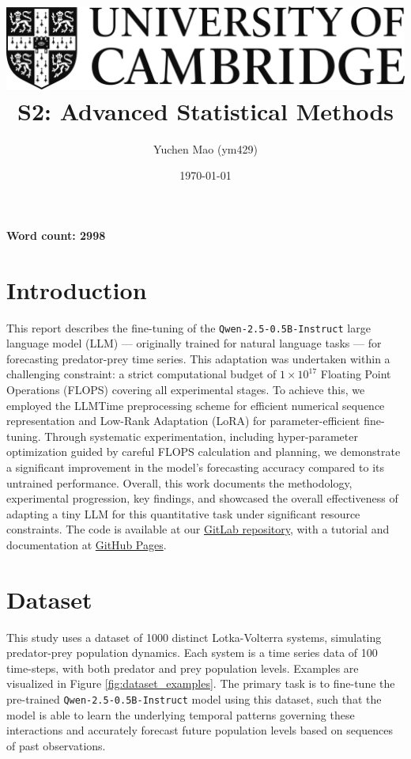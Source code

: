 \documentclass{article}
\title{
    \includegraphics[scale=0.2]{Images/cam_logo_bw.png}\\ %
    \vspace{0.5cm}
    S2: Advanced Statistical Methods
}
\author{Yuchen Mao (ym429)}
\affil{Department of Physics, University of Cambridge}
\date{\today}
\begin{document}
\maketitle
\noindent\textbf{Word count: 2998}
\tableofcontents
{}

\newpage


\section{Introduction}
\label{sec:introduction}

This report describes the fine-tuning of the \texttt{Qwen-2.5-0.5B-Instruct} large language model (LLM) — originally trained for natural language tasks — for forecasting predator-prey time series. This adaptation was undertaken within a challenging constraint: a strict computational budget of $1 \times 10^{17}$ Floating Point Operations (FLOPS) covering all experimental stages. To achieve this, we employed the LLMTime preprocessing scheme \cite{gruver2024largelanguagemodelszeroshot} for efficient numerical sequence representation and Low-Rank Adaptation (LoRA) \cite{hu2021loralowrankadaptationlarge} for parameter-efficient fine-tuning. Through systematic experimentation, including hyper-parameter optimization guided by careful FLOPS calculation and planning, we demonstrate a significant improvement in the model's forecasting accuracy compared to its untrained performance. Overall, this work documents the methodology, experimental progression, key findings, and showcased the overall effectiveness of adapting a tiny LLM for this quantitative task under significant resource constraints. The code is available at our \href{https://gitlab.developers.cam.ac.uk/phy/data-intensive-science-mphil/assessments/m2_coursework/ym429}{GitLab repository}, with a tutorial and documentation at \href{https://yuchen20.github.io/M2-Coursework/}{GitHub Pages}.

\section{Dataset}
\label{sec:dataset}

This study uses a dataset of 1000 distinct Lotka-Volterra systems, simulating predator-prey population dynamics. Each system is a time series data of 100 time-steps, with both predator and prey population levels. Examples are visualized in Figure \ref{fig:dataset_examples}. The primary task is to fine-tune the pre-trained \texttt{Qwen-2.5-0.5B-Instruct} model using this dataset, such that the model is able to learn the underlying temporal patterns governing these interactions and accurately forecast future population levels based on sequences of past observations.
\end{document}
